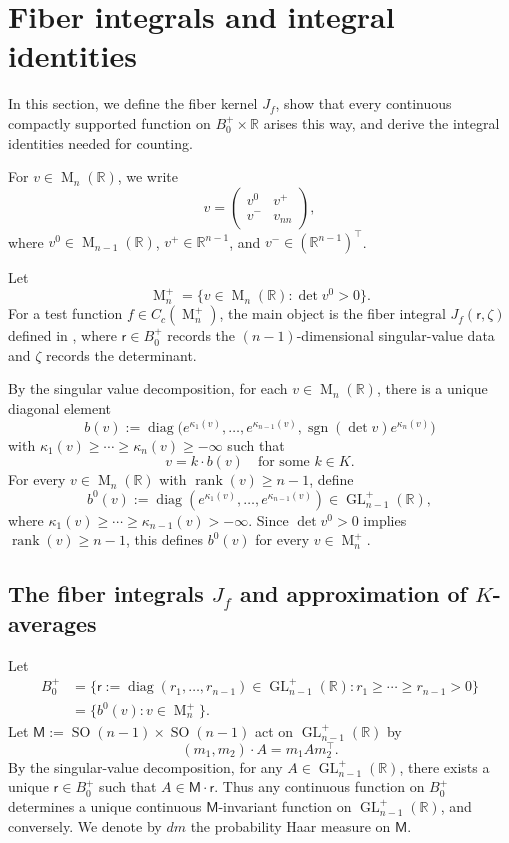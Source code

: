 \documentclass[reqno,11pt]{amsart}
\numberwithin{equation}{section}
\theoremstyle{definition}
\theoremstyle{remark}
\newcommand{\op}{\operatorname}
\newcommand{\be}{\begin{equation}}
\newcommand{\ee}{\end{equation}}
\newcommand{\rank}{\op{rank}}
\newcommand{\R}{\mathbb R}
\newcommand{\br}{\mathbb R}
\newcommand{\SO}{\op{SO}}
\newcommand{\M}{\op{M}}
\newcommand{\GL}{\op{GL}}
\newcommand{\diag}{\op{diag}}
\renewcommand{\r}{\mathsf r}
\begin{document}
\section{Fiber integrals and integral identities}\label{s:fiberintegral}
In this section, we define the fiber kernel $J_f$, show that 
every continuous compactly supported function on $B_0^+\times\mathbb R$ arises this way, and derive the
integral identities needed for counting.


For $v\in \M_n(\R)$, we write
\be\label{vzero}
v=\begin{pmatrix}
v^0 & v^+\\
v^- & v_{nn}
\end{pmatrix},
\ee
where $v^0\in \M_{n-1}(\R)$, $v^+\in \R^{n-1}$, and
$v^-\in (\R^{n-1})^{\intercal}$.

Let
$$
\M_n^+=\{v\in \M_n(\R): \det v^0>0\}.
$$  For a test function
$f\in C_c(\M_n^+)$, the main object is the fiber integral
$J_f(\mathsf r,\zeta)$ defined in , where $\mathsf r\in B_0^+$ records the $(n-1)$-dimensional
singular-value data and $\zeta$ records the determinant.




By the singular value decomposition, for each $v\in \M_n(\R)$, there is a unique diagonal element $$b(v):=\diag\bigl(e^{\kappa_1(v)},\dots,e^{\kappa_{n-1}(v)},\operatorname{sgn}(\det v)e^{\kappa_n(v)}\bigr)
$$ with $\kappa_1(v)\ge \cdots \ge \kappa_n(v)\ge -\infty$ such that
$$
v=k\cdot b(v) \quad\text{for some $k\in K$.}
$$
For every $v\in\M_n(\mathbb R)$ with
$\operatorname{rank}(v)\ge n-1$, define
$$
b^0(v)
:=
\diag(e^{\kappa_1(v)},\dots,e^{\kappa_{n-1}(v)})
\in\GL_{n-1}^+(\mathbb R),
$$
where $\kappa_1(v)\ge \cdots \ge \kappa_{n-1}(v) >-\infty$. Since $\det v^0>0$ implies $\rank(v)\ge n-1$, this defines
$b^0(v)$ for every $v\in\M_n^+$.


\subsection{The fiber integrals $J_f$ and approximation of $K$-averages}
Let  \begin{align*} B_0^+ &=\{\mathsf r:=\diag (r_1, \ldots, r_{n-1})\in \GL_{n-1}^+(\br): r_1\ge \cdots \ge r_{n-1}>0\}\\ &=\{b^0(v): v\in \M_n^+\}.\end{align*}
Let
$
\mathsf M:=\SO(n-1)\times\SO(n-1)
$
act on $\GL_{n-1}^+(\mathbb R)$ by
$$
(m_1,m_2)\cdot A=m_1 Am_2^{\intercal}.
$$
By the singular-value decomposition, for any
$A\in \GL_{n-1}^+(\R)$, there exists a unique $\r\in B_0^+$ such that $A\in \mathsf M\cdot \r$.
Thus any continuous function on  $B_0^+$ determines a unique continuous $\mathsf M$-invariant function on $\GL_{n-1}^+(\R)$, and conversely. We denote by $dm$ the probability Haar measure on $\mathsf M$.
\end{document}

